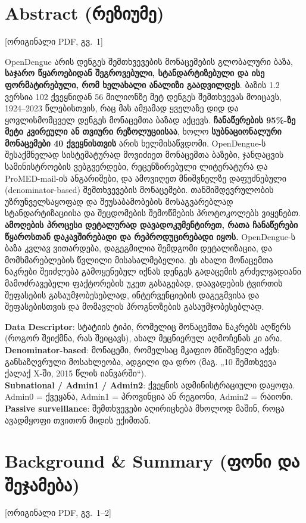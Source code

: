 \documentclass[11pt,a4paper]{article}
\newcommand{\imp}[1]{\textbf{\color{importred}#1}}
\newcommand{\pg}[1]{{\small\color{gray}[ორიგინალი PDF, გვ.~#1]}}
\begin{document}
\section{Abstract (რეზიუმე)} \pg{1}

OpenDengue არის დენგეს შემთხვევების მონაცემების გლობალური ბაზა, \imp{საჯარო წყაროებიდან შეგროვებული, სტანდარტიზებული
და ისე ფორმატირებული, რომ ხელახალი ანალიზი გაადვილდეს}. ბაზის 1.2 ვერსია 102 ქვეყნიდან 56 მილიონზე მეტ დენგეს შემთხვევას
მოიცავს, 1924--2023 წლებისთვის, რაც მას ამჟამად ყველაზე დიდ და ყოვლისმომცველ დენგეს მონაცემთა ბაზად აქცევს.
\imp{ჩანაწერების 95\%-ზე მეტი კვირეული ან თვიური რეზოლუციისაა}, ხოლო \imp{სუბნაციონალური მონაცემები 40 ქვეყნისთვის} არის
ხელმისაწვდომი. OpenDengue-ს შესაქმნელად სისტემატურად მოვიძიეთ მონაცემთა ბაზები, ჯანდაცვის სამინისტროების ვებგვერდები,
რეცენზირებული ლიტერატურა და ProMED-mail-ის ანგარიშები, და ამოვიღეთ მნიშვნელზე დაფუძნებული (denominator-based) შემთხვევების
მონაცემები. თანმიმდევრულობის უზრუნველსაყოფად და შეუსაბამობების მოსაგვარებლად სტანდარტიზაციისა და შეცდომების შემოწმების
პროტოკოლებს ვიყენებთ. \imp{ამოღების პროცესი დეტალურად დავადოკუმენტირეთ, რათა ჩანაწერები წყაროსთან დაკავშირებადი და
რეპროდუცირებადი იყოს.} OpenDengue-ს ბაზა კვლავ ვითარდება, დაგეგმილია შემდგომი დეტალიზაცია, და მომხმარებლების წვლილი
მისასალმებელია. ეს ახალი მონაცემთა ნაკრები შეიძლება გამოყენებულ იქნას დენგეს გადაცემის გრძელვადიანი მამოძრავებელი
ფაქტორების უკეთ გასაგებად, დაავადების ტვირთის შეფასების გასაუმჯობესებლად, ინტერვენციების დაგეგმვისა და შეფასებისთვის და
მომავლის პროგნოზების გასაუმჯობესებლად.

\begin{termin}
\textbf{Data Descriptor}: სტატიის ტიპი, რომელიც მონაცემთა ნაკრებს აღწერს (როგორ შეიქმნა, რას შეიცავს), ახალ მეცნიერულ აღმოჩენას კი არა.\\
\textbf{Denominator-based}: მონაცემი, რომელსაც მკაფიო მნიშვნელი აქვს: განსაზღვრული მოსახლეობა, ადგილი და დრო (მაგ. „10 შემთხვევა ქალაქ X-ში, 2015 წლის იანვარში“).\\
\textbf{Subnational / Admin1 / Admin2}: ქვეყნის ადმინისტრაციული დაყოფა. Admin0 = ქვეყანა, Admin1 = პროვინცია ან რეგიონი, Admin2 = რაიონი.\\
\textbf{Passive surveillance}: შემთხვევები აღირიცხება მხოლოდ მაშინ, როცა ავადმყოფი თვითონ მიდის ექიმთან.
\end{termin}

\section{Background \& Summary (ფონი და შეჯამება)} \pg{1--2}
\end{document}
